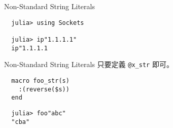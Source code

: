 \documentclass[14pt]{beamer}
\begin{document}
\begin{frame}[fragile]{Non-Standard String Literals}
\begin{lstlisting}
  julia> using Sockets

  julia> ip"1.1.1.1"
  ip"1.1.1.1
\end{lstlisting}
\end{frame}


\begin{frame}[fragile]{Non-Standard String Literals}
  只要定義 \texttt{@x\_str} 即可。

  \pause

\begin{lstlisting}
  macro foo_str(s)
    :(reverse($s))
  end
\end{lstlisting}

  \pause
\begin{lstlisting}
  julia> foo"abc"
  "cba"
\end{lstlisting}
\end{frame}
\end{document}
